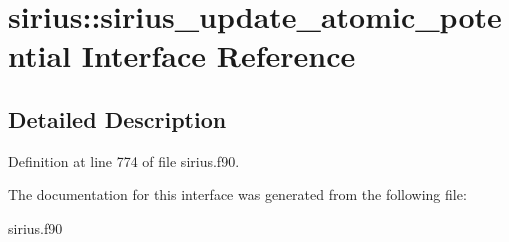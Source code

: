 \hypertarget{interfacesirius_1_1sirius__update__atomic__potential}{}\section{sirius\+:\+:sirius\+\_\+update\+\_\+atomic\+\_\+potential Interface Reference}
\label{interfacesirius_1_1sirius__update__atomic__potential}


\subsection{Detailed Description}


Definition at line 774 of file sirius.\+f90.



The documentation for this interface was generated from the following file\+:\begin{DoxyCompactItemize}
\item 
sirius.\+f90\end{DoxyCompactItemize}
